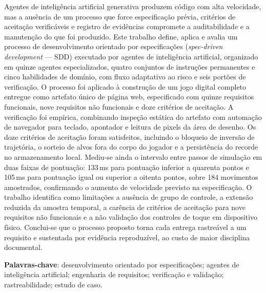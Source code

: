 \begin{resumo}
	Agentes de inteligência artificial generativa produzem código com alta
	velocidade, mas a ausência de um processo que force especificação prévia,
	critérios de aceitação verificáveis e registro de evidências compromete a
	auditabilidade e a manutenção do que foi produzido. Este trabalho define,
	aplica e avalia um processo de desenvolvimento orientado por especificações
	(\textit{spec-driven development} --- SDD) executado por agentes de
	inteligência artificial, organizado em quinze agentes especializados,
	quatro conjuntos de instruções permanentes e cinco habilidades de domínio,
	com fluxo adaptativo ao risco e seis portões de verificação. O processo foi
	aplicado à construção de um jogo digital completo entregue como artefato
	único de página web, especificado com quinze requisitos funcionais, nove
	requisitos não funcionais e doze critérios de aceitação. A verificação foi
	empírica, combinando inspeção estática do artefato com automação de
	navegador para teclado, apontador e leitura de pixels da área de desenho.
	Os doze critérios de aceitação foram satisfeitos, incluindo o bloqueio de
	inversão de trajetória, o sorteio de alvos fora do corpo do jogador e a
	persistência do recorde no armazenamento local. Mediu-se ainda o intervalo
	entre passos de simulação em duas faixas de pontuação: 133\,ms para
	pontuação inferior a quarenta pontos e 105\,ms para pontuação igual ou
	superior a oitenta pontos, sobre 184 movimentos amostrados, confirmando o
	aumento de velocidade previsto na especificação. O trabalho identifica como
	limitações a ausência de grupo de controle, a extensão reduzida da amostra
	temporal, a carência de critérios de aceitação para nove requisitos não
	funcionais e a não validação dos controles de toque em dispositivo físico.
	Conclui-se que o processo proposto torna cada entrega rastreável a um
	requisito e sustentada por evidência reproduzível, ao custo de maior
	disciplina documental.

	\vspace{\onelineskip}

	\noindent
	\textbf{Palavras-chave}: desenvolvimento orientado por especificações;
	agentes de inteligência artificial; engenharia de requisitos; verificação e
	validação; rastreabilidade; estudo de caso.
\end{resumo}

